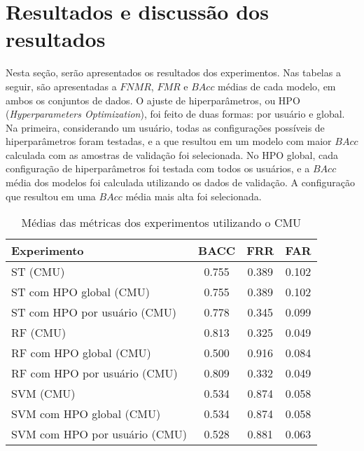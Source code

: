 \section{Resultados e discussão dos resultados}\label{sec:resultados}

Nesta seção, serão apresentados os resultados dos experimentos. Nas tabelas a seguir, são apresentadas a $FNMR$, $FMR$ e $BAcc$ médias de cada modelo, em ambos os conjuntos de dados. O ajuste de hiperparâmetros, ou HPO (\textit{Hyperparameters Optimization}), foi feito de duas formas: por usuário e global. Na primeira, considerando um usuário, todas as configurações possíveis de hiperparâmetros foram testadas, e a que resultou em um modelo com maior $BAcc$ calculada com as amostras de validação foi selecionada. No HPO global, cada configuração de hiperparâmetros foi testada com todos os usuários, e a $BAcc$ média dos modelos foi calculada utilizando os dados de validação. A configuração que resultou em uma $BAcc$ média mais alta foi selecionada.

\begin{table}[htbp]
\centering
\caption{Médias das métricas dos experimentos utilizando o CMU}\label{tab:exp_metric_averages_cmu}
\begin{tabular}{|l|c|c|c|}
\hline
\textbf{Experimento} & \textbf{BACC} & \textbf{FRR} & \textbf{FAR} \\
\hline
ST (CMU) & 0.755 & 0.389 & 0.102 \\
\hline
ST com HPO global (CMU) & 0.755 & 0.389 & 0.102 \\
\hline
ST com HPO por usuário (CMU) & 0.778 & 0.345 & 0.099 \\
\hline
RF (CMU) & 0.813 & 0.325 & 0.049 \\
\hline
RF com HPO global (CMU) & 0.500 & 0.916 & 0.084 \\
\hline
RF com HPO por usuário (CMU) & 0.809 & 0.332 & 0.049 \\
\hline
SVM (CMU) & 0.534 & 0.874 & 0.058 \\
\hline
SVM com HPO global (CMU) & 0.534 & 0.874 & 0.058 \\
\hline
SVM com HPO por usuário (CMU) & 0.528 & 0.881 & 0.063 \\
\hline
\end{tabular}
\end{table}

